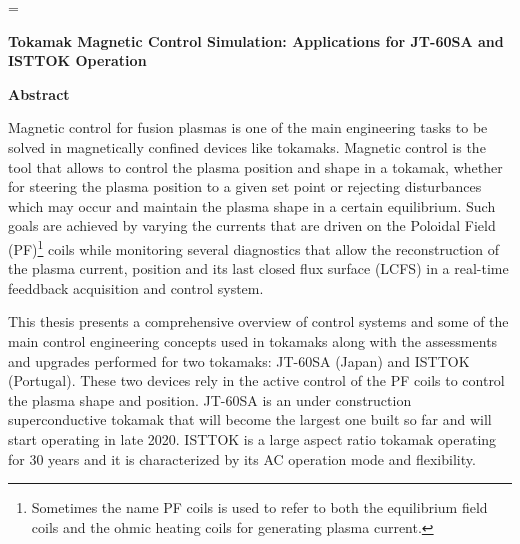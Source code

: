 





\usepackage{enumitem}
\usepackage{notoccite}
\usepackage{longtable}
\usepackage{multirow}
\usepackage{lipsum}
\usepackage{xcolor,colortbl}
\usepackage{mathtools}

\DeclareMathOperator*{\argmin}{arg\,min}
\DeclareMathOperator{\dist}{\mathit{dist}}


	\emergencystretch=\maxdimen
	
	{\fontsize{12}{12}\selectfont \textbf{	Tokamak Magnetic Control Simulation: Applications for JT-60SA and ISTTOK Operation}}
	\smallskip
\setlength{\parskip}{1em}

	
	\textbf{Abstract}
	\smallskip
	
	Magnetic control for fusion plasmas is one of the main engineering tasks to be solved in magnetically  confined devices like tokamaks. Magnetic control is the tool that allows to control the plasma position and shape in a tokamak, whether  for steering the plasma position to a given set point or rejecting disturbances which may occur and maintain the plasma shape in a certain equilibrium. Such goals are achieved by varying the currents that are driven on the Poloidal Field (PF)\footnote{Sometimes the name PF coils is used to refer to  both the equilibrium field coils and the ohmic heating coils for generating plasma current.} coils while monitoring several diagnostics that allow the reconstruction of the plasma current, position and its last closed flux surface (LCFS) in a real-time feeddback acquisition and control system.
	\smallskip
	
	This thesis presents a comprehensive overview of control systems and some of the main control engineering concepts used in tokamaks along with  the assessments and upgrades performed for two tokamaks: JT-60SA (Japan) and ISTTOK (Portugal). These two devices rely in the active control of the PF coils to control the plasma shape and position. JT-60SA is an under construction superconductive tokamak that will become the largest one built so far and will start operating in late 2020. ISTTOK is a large aspect ratio tokamak operating for 30 years and it is characterized by its AC operation mode and flexibility. \smallskip
	
